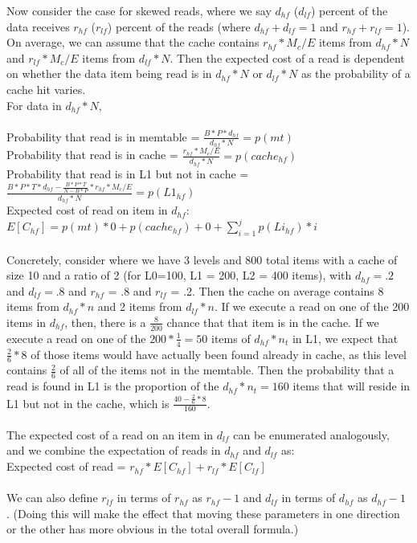 \documentclass[11pt]{article}
\theoremstyle{plain}
\theoremstyle{definition}
\begin{document}
Now consider the case for skewed reads, where we say $d_{hf}$ ($d_{lf}$) percent of the data receives $r_{hf}$ ($r_{lf}$) percent of the reads (where $d_{hf} + d_{lf} = 1$ and $r_{hf} + r_{lf} = 1$). On average, we can assume that the cache contains $r_{hf} * M_c/E$ items from $d_{hf} * N$ and $r_{lf} * M_c/E$ items from $d_{lf} * N$. Then the expected cost of a read is dependent on whether the data item being read is in $d_{hf} * N$ or $d_{lf} * N$ as the probability of a cache hit varies.\\
For data in $d_{hf} * N$, \\ \\
Probability that read is in memtable = $\frac{B*P*d_{hf}}{d_{hf} *N}  = p(mt)$\\
Probability that read is in cache = $\frac{r_{hf} * M_c/E}{d_{hf} * N} = p(cache_{hf})$ \\
Probability that read is in L1 but not in cache = $ \frac{B*P * T*d_{hf} - \frac{B*P * T}{N-B*P} * r_{hf} * M_c/E}{d_{hf} * N}  = p(L1_{hf})$ \\
Expected cost of read on item in $d_{hf}$: $E[C_{hf}]= p(mt) * 0  + p(cache_{hf}) + 0 + \sum_{i=1}^j p(Li_{hf}) * i$\\ \\
Concretely, consider where we have 3 levels and 800 total items with a cache of size 10 and a ratio of 2  (for L0=100, L1 = 200, L2 = 400 items), with $d_{hf} = .2$ and $d_{lf} = .8$ and $r_{hf}$ = .8 and $r_{lf}$ = .2. Then the cache on average contains 8 items from $d_{hf} * n$ and 2 items from $d_{lf}*n$. If we execute a read on one of the 200 items in $d_{hf}$, then, there is a $\frac{8}{200}$ chance that that item is in the cache. If we execute a read on one of the $200*\frac{1}{4} = 50$ items of  $d_{hf} * n_t$ in L1, we expect that $\frac{2}{6} * 8$ of those items would have actually been found already in cache, as this level contains $\frac{2}{6}$ of all of the items not in the memtable. Then the probability that a read is found in L1 is the proportion of the $d_{hf} * n_t = 160$ items that will reside in L1 but not in the cache, which is $\frac{40 - \frac{2}{6} * 8}{160}$. \\ \\
The expected cost of a read on an item in $d_{lf}$ can be enumerated analogously, and we combine the expectation of reads in $d_{hf}$ and $d_{lf}$ as: \\
Expected cost of read = $r_{hf} * E[C_{hf}] + r_{lf} * E[C_{lf}]$ \\ \\
We can also define $r_{lf}$ in terms of $r_{hf}$ as $r_{hf} - 1$ and  $d_{lf}$ in terms of $d_{hf}$ as $d_{hf} - 1$ . (Doing this will make the effect that moving these parameters in one direction or the other has more obvious in the total overall formula.)
\end{document}
